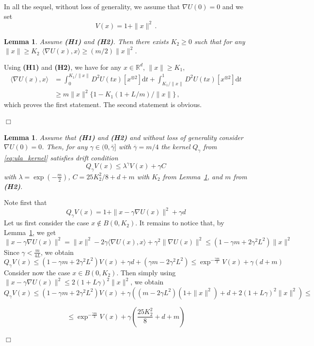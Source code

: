 \documentclass[bj]{imsart}
\newcommand{\ps}[2]{\langle #1, #2 \rangle}
\def\rset{\mathbb{R}}
\def\rmd{\mathrm{d}}
\def\rset{\mathbb{R}}
\newcommand{\proofendsign}{$\Box$}
\newtheorem{lem}[thm]{Lemma}
\newenvironment{proof}{{\noindent \bf Proof }}
 {{\hspace*{\fill}\proofendsign\par\bigskip}}
\def\eqsp{\,}
\begin{document}
In all the sequel, without loss of generality, we assume that $\nabla U(0)=0$ and we set
\begin{equation}
\label{eq:definition-V}
V(x) = 1 + \|x\|^2 \eqsp.
\end{equation}
\begin{lem}
  \label{lem:quadratic_behaviour}
  Assume {\bf (H1)} and {\bf (H2)}. Then there exists $K_2 \geq 0$ such that for any $ \| x \| \geq K_2$ $\ps{\nabla U(x)}{x} \geq (m/2) \| x \|^2$.
\end{lem}
\begin{proof}
  Using {\bf (H1)} and {\bf (H2)}, we have for any $x \in \rset^d$, $\| x \|\geq K_1$,
  \begin{align*}
    \ps{\nabla U(x)}{x}
    &= \int_{0}^{K_1/\| x \|} D^2 U(t x ) [x^{\otimes 2}] \rmd t + \int_{K_1/\| x \|} ^ 1 D^2 U(t x ) [x^{\otimes 2}] \rmd t\\
    & \geq m \|x \|^2 \{1- K_1 (1 +L/m)   / \| x \| \}\eqsp,
  \end{align*}
which proves the first statement. The second statement is obvious.
\end{proof}
\begin{lem}
\label{lem:drift}
 Assume that {\bf (H1)} and {\bf (H2)} and without loss of generality consider $\nabla U(0) = 0$.
 Then, for any $\gamma \in (0,\bar{\gamma}]$ with $\overline{\gamma} = m/4$  the kernel $Q_\gamma$ from \eqref{eq:ula_kernel} satisfies drift condition
 \begin{equation}
\label{eq:lyapunov}
Q_{\gamma}V(x) \leq \lambda^{\gamma} V(x) + \gamma C
\end{equation}
with   $\lambda = \exp{\left(-\frac{m}{2}\right)}$, $C = 25K_2^2/8 + d + m$ with $K_2$ from Lemma~\ref{lem:quadratic_behaviour}, and $m$ from {\bf (H2)}.
\end{lem}

\begin{proof} 
Note first that
\[
Q_{\gamma}V(x) = 
1+ \| x - \gamma \nabla U(x) \|^2 + \gamma d
\]
Let us first consider the case $x \notin B(0,K_2)$.  
It remains to notice that, by Lemma~\ref{lem:quadratic_behaviour}, we get
\[
\|x - \gamma \nabla U(x) \|^2 = \|x\|^2 - 2\gamma \langle \nabla U(x), x\rangle + \gamma^2 \|\nabla U(x)\|^2 \leq \left(1 - \gamma m + 2\gamma^2 L^2\right)\|x\|^2
\]
Since $\gamma < \frac{m}{4L}$, we obtain
$$
Q_{\gamma}V(x) \leq (1-\gamma m + 2\gamma^2 L^2)V(x) + \gamma d + (\gamma m - 2\gamma^2 L^2) \leq \exp^{-\frac{\gamma m}{2}}V(x) + \gamma (d + m)
$$
Consider now the case $x \in B(0,K_2)$. Then simply using $\|x-\gamma \nabla U(x)\|^2 \leq 2(1+L\gamma)^2\|x\|^2$, we obtain
$$
Q_{\gamma}V(x) \leq (1-\gamma m + 2\gamma^2 L^2)V(x) + \gamma\left((m - 2\gamma L^2)(1+\|x\|^2) + d + 2(1+L\gamma)^2\|x\|^2\right) \leq
$$

$$
\leq \exp^{-\frac{\gamma m}{2}}V(x) + \gamma(\frac{25K_2^2}{8} + d + m)
$$
\end{proof}
\end{document}
